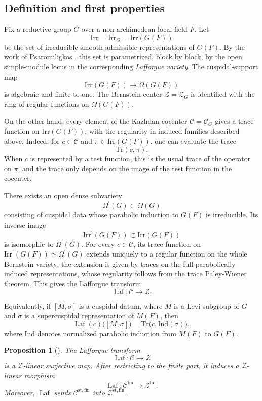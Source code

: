 \documentclass[iccmp]{ipbook}
\newcommand{\CC}{{\mathcal {C}}}
\newcommand{\CZ}{{\mathcal {Z}}}
\newcommand{\Ind}{{\mathrm{Ind}}}
\newcommand{\st}{{\mathrm{st}}}
\def\sig{{\sigma}}
\def\Ome{{\Omega}}
\newcommand{\Laf}{\operatorname{Laf}}
\newcommand{\fin}{\mathrm{fin}}
\def\p{\prime}
\def\Tr{\mathrm{Tr}}
\def\Irr{\mathrm{Irr}}
\newtheorem{pro}[thm]{Proposition}
\begin{document}
\subsection{Definition and first properties}\label{subsec:Laf-definition}

Fix a reductive group $G$ over a non-archimedean local field $F$. Let
\[
\Irr=\Irr_G=\Irr(G(F))
\]
be the set of irreducible smooth admissible representations of $G(F)$. By the work of
Psaromiligkos \cite{psaromiligkos_lafforgue_2023}, this set is parametrized, block by block,
by the open simple-module locus in the corresponding \emph{Lafforgue variety}. The
cuspidal-support map
\[
\Irr(G(F))\longrightarrow \Ome(G(F))
\]
is algebraic and finite-to-one. The Bernstein center $\CZ=\CZ_G$ is
identified with the ring of regular functions on $\Ome(G(F))$.

On the other hand, every element of the Kazhdan cocenter $\CC=\CC_G$ gives a trace
function on $\Irr(G(F))$, with the regularity in induced families described above. Indeed, for $c\in \CC$ and
$\pi\in \Irr(G(F))$, one can evaluate the trace
\[
\Tr(c,\pi).
\]
When $c$ is represented by a test function, this is the usual trace of the operator on
$\pi$, and the trace only depends on the image of the test function in the cocenter.

There exists an open dense subvariety
\[
\Ome^\p(G)\subset \Ome(G)
\]
consisting of cuspidal data whose parabolic induction to $G(F)$ is irreducible. Its inverse
image
\[
\Irr^\p(G(F))\subset \Irr(G(F))
\]
is isomorphic to $\Ome^\p(G)$. For every $c\in \CC$, its trace function on
$\Irr^\p(G(F))\simeq \Ome^\p(G)$ extends uniquely to a regular function on the whole
Bernstein variety: the extension is given by traces on the full parabolically induced
representations, whose regularity follows from the trace Paley-Wiener theorem.
This gives the Lafforgue transform
\begin{equation}\label{eq:Laf-Rep:1}
\Laf:\CC\longrightarrow \CZ.
\end{equation}

Equivalently, if $[M,\sig]$ is a cuspidal datum, where $M$ is a Levi subgroup of $G$ and
$\sig$ is a supercuspidal representation of $M(F)$, then
\begin{equation}\label{eq:Laf-Rep:2}
\Laf(c)\big([M,\sig]\big)=
\Tr\big(c,\Ind(\sig)\big),
\end{equation}
where $\Ind$ denotes normalized parabolic induction from $M(F)$ to $G(F)$.

\begin{pro}[{\cite[\S 5.1]{LN}}]\label{pro:Laf-surjective}
The Lafforgue transform
\[
\Laf:\CC\to \CZ
\]
is a $\CZ$-linear surjective map. After restricting to the finite part, it induces a
$\CZ$-linear morphism
\[
\Laf:\CC^{\fin}\to \CZ^{\fin}.
\]
Moreover, $\Laf$ sends $\CC^{\st,\fin}$ into $\CZ^{\st,\fin}$.
\end{pro}
\end{document}
